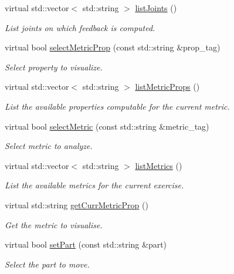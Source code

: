\begin{DoxyCompactItemize}
virtual std\+::vector$<$ std\+::string $>$ \mbox{\hyperlink{classmotionAnalyzer__IDL_aaec274413bf24d3e213ce6cfb2592748}{list\+Joints}} ()
\begin{DoxyCompactList}\small\item\em List joints on which feedback is computed. \end{DoxyCompactList}\item 
virtual bool \mbox{\hyperlink{classmotionAnalyzer__IDL_a964bfaa136ee53f793260747531a9cb2}{select\+Metric\+Prop}} (const std\+::string \&prop\+\_\+tag)
\begin{DoxyCompactList}\small\item\em Select property to visualize. \end{DoxyCompactList}\item 
virtual std\+::vector$<$ std\+::string $>$ \mbox{\hyperlink{classmotionAnalyzer__IDL_a05b2616e56207a2acc4dbc4429f56609}{list\+Metric\+Props}} ()
\begin{DoxyCompactList}\small\item\em List the available properties computable for the current metric. \end{DoxyCompactList}\item 
virtual bool \mbox{\hyperlink{classmotionAnalyzer__IDL_a7e166c4cc32ecf37cf1a3e0235e0bb4d}{select\+Metric}} (const std\+::string \&metric\+\_\+tag)
\begin{DoxyCompactList}\small\item\em Select metric to analyze. \end{DoxyCompactList}\item 
virtual std\+::vector$<$ std\+::string $>$ \mbox{\hyperlink{classmotionAnalyzer__IDL_a139730029d1e7112eb66636c21fe99c8}{list\+Metrics}} ()
\begin{DoxyCompactList}\small\item\em List the available metrics for the current exercise. \end{DoxyCompactList}\item 
virtual std\+::string \mbox{\hyperlink{classmotionAnalyzer__IDL_a2caac2fd16a9abd91b59615dbb717c88}{get\+Curr\+Metric\+Prop}} ()
\begin{DoxyCompactList}\small\item\em Get the metric to visualise. \end{DoxyCompactList}\item 
virtual bool \mbox{\hyperlink{classmotionAnalyzer__IDL_ae6a1abf3aac4582688320f30a75bf768}{set\+Part}} (const std\+::string \&part)
\begin{DoxyCompactList}\small\item\em Select the part to move. \end{DoxyCompactList}\item 

\end{DoxyCompactItemize}
